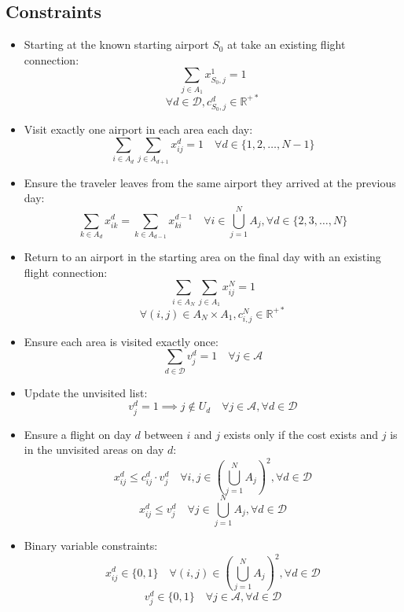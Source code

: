 \subsection*{Constraints}
\begin{itemize}
    \item Starting at the known starting airport $S_{0}$ at take an existing flight connection:
          \[ \sum_{j \in A_1} x_{S_{0},j}^1 = 1 \]
          \[ \forall d \in \mathcal{D}, c_{S_0,j}^{d} \in \mathbb{R^{+*}}\]

    \item Visit exactly one airport in each area each day:
          \[ \sum_{i \in A_{d}} \sum_{j \in A_{d+1}} x_{ij}^d = 1 \quad \forall d \in \{1, 2, \ldots, N-1\} \]

    \item Ensure the traveler leaves from the same airport they arrived at the previous day:
          \[ \sum_{k \in A_d} x_{ik}^d = \sum_{k \in A_{d-1}} x_{ki}^{d-1} \quad \forall i \in \bigcup_{j=1}^N A_j, \forall d \in \{2, 3, \ldots, N\} \]

    \item Return to an airport in the starting area on the final day with an existing flight connection:
          \[ \sum_{i \in A_N} \sum_{j \in A_1} x_{ij}^N = 1 \]
          \[ \forall (i,j) \in A_N \times A_1, c_{i,j}^{N} \in \mathbb{R^{+*}}\]

    \item Ensure each area is visited exactly once:
          \[ \sum_{d \in \mathcal{D}} v_j^d = 1 \quad \forall j \in \mathcal{A} \]

    \item Update the unvisited list:
          \[ v_j^d = 1 \implies j \notin U_d \quad \forall j \in \mathcal{A}, \forall d \in \mathcal{D} \]

    \item Ensure a flight on day $d$ between $i$ and $j$ exists only if the cost exists and $j$ is in the unvisited areas on day $d$:
          \[ x_{ij}^d \leq c_{ij}^d \cdot v_j^d \quad \forall i, j \in (\bigcup_{j=1}^N A_j)^2, \forall d \in \mathcal{D} \]
          \[ x_{ij}^d \leq v_j^d \quad \forall j \in \bigcup_{j=1}^N A_j, \forall d \in \mathcal{D} \]



    \item Binary variable constraints:
          \[x_{ij}^d \in \{0, 1\} \quad \forall (i, j) \in (\bigcup_{j=1}^N A_j)^2, \forall d \in \mathcal{D}\]
          \[ v_j^d \in \{0, 1\} \quad \forall j \in \mathcal{A}, \forall d \in \mathcal{D} \]

\end{itemize}

